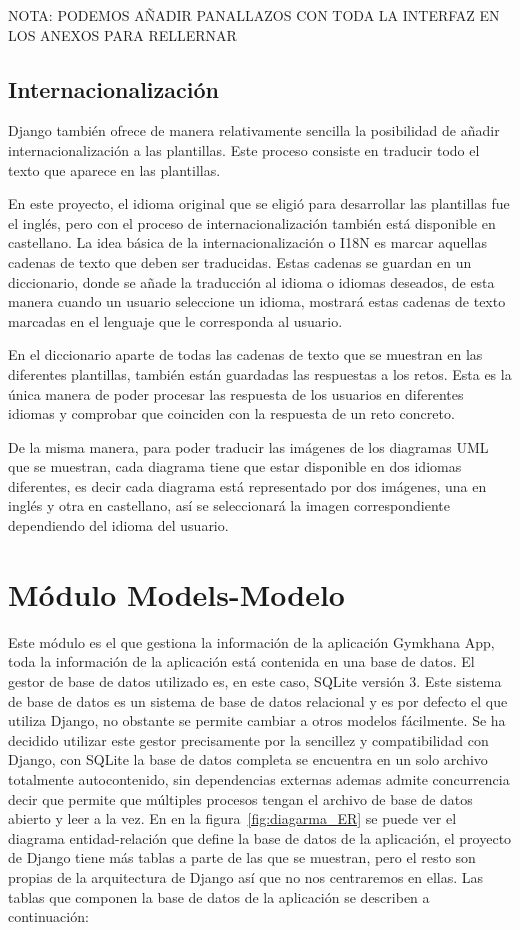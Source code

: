 \documentclass[a4paper, 12pt]{book}
\begin{document}
NOTA: PODEMOS AÑADIR PANALLAZOS CON TODA LA INTERFAZ EN LOS ANEXOS PARA RELLERNAR

\subsection{Internacionalización}
Django también ofrece de manera relativamente sencilla la posibilidad de añadir internacionalización a las plantillas. Este proceso consiste en traducir todo el texto que aparece en las plantillas. 

En este proyecto, el idioma original que se eligió para desarrollar las plantillas fue el inglés, pero con el proceso de internacionalización también está disponible en castellano. La idea básica de la internacionalización o I18N es marcar aquellas cadenas de texto que deben ser traducidas. Estas cadenas se guardan en un diccionario, donde se añade la traducción al idioma o idiomas deseados, de esta manera cuando un usuario seleccione un idioma, mostrará estas cadenas de texto marcadas en el lenguaje que le corresponda al usuario. 

En el diccionario aparte de todas las cadenas de texto que se muestran en las diferentes plantillas, también están guardadas las respuestas a los retos. Esta es la única manera de poder procesar las respuesta de los usuarios en diferentes idiomas y comprobar que coinciden con la respuesta de un reto concreto. 

De la misma manera, para poder traducir las imágenes de los diagramas UML que se muestran, cada diagrama tiene que estar disponible en dos idiomas diferentes, es decir cada diagrama está representado por dos imágenes, una en inglés y otra en castellano, así se seleccionará la imagen correspondiente dependiendo del idioma del usuario. 

\section{Módulo Models-Modelo}
Este módulo es el que gestiona la información de la aplicación Gymkhana App, toda la información de la aplicación está contenida en una base de datos. El gestor de base de datos utilizado es, en este caso, SQLite versión 3. Este sistema de base de datos es un sistema de base de datos relacional y es por defecto el que utiliza Django, no obstante se permite cambiar a otros modelos fácilmente. Se ha decidido utilizar este gestor precisamente por la sencillez y compatibilidad con Django, con SQLite la base de datos completa se encuentra en un solo archivo totalmente autocontenido, sin dependencias externas ademas admite concurrencia decir que permite que múltiples procesos tengan el archivo de base de datos abierto y leer a la vez. En  en la figura~\ref{fig:diagarma_ER} se puede ver el diagrama entidad-relación que define la base de datos de la aplicación, el proyecto de Django tiene más tablas a parte de las que se muestran, pero el resto son propias de la arquitectura de Django así que no nos centraremos en ellas. Las tablas que componen la base de datos de la aplicación se describen a continuación:
\end{document}
